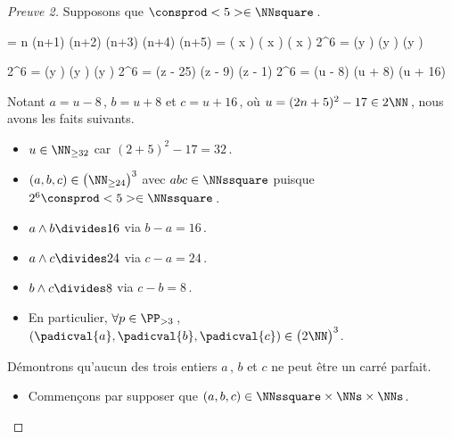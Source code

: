 \begin{proof}[Preuve 2]%
    Supposons que $\consprod<5> \in \NNsquare$\,.

    \medskip
    \begin{stepcalc}[style = ar*, ope = \iff]
    	 = 
			n (n+1) (n+2) (n+3) (n+4) (n+5)
    	\consprod<5> = 
			\big( x \pm {} \big) \big( x \pm {} \big) \big( x \pm {} \big) 
    	2^6 \consprod<5> = 
			(y ) (y ) (y )
    \end{stepcalc}
    
    \begin{stepcalc}[style = ar*, ope = \iff]
    	2^6 \consprod<5> = 
			(y ) (y ) (y )
    	2^6 \consprod<5> = 
			(z - 25) (z - 9) (z - 1) 
    	2^6 \consprod<5> = 
			(u - 8) (u + 8) (u + 16)
    \end{stepcalc}

    \medskip
    Notant $a = u - 8$\,, $b = u + 8$ et $c = u + 16$\,, où $u = (2 n + 5)^2 - 17 \in 2 \NN$\,, nous avons les faits suivants.
    
    \begin{itemize}
		\item $u \in \NN_{\geq 32}$ car $(2 + 5)^2 - 17 = 32$\,.

		\item $(a, b, c) \in \big( \NN_{\geq 24} \big)^3$ avec $abc \in \NNssquare$ puisque $2^6 \consprod<5> \in \NNssquare$\,.

		\item $a \wedge b \divides 16$ via $b - a = 16$\,.

		\item $a \wedge c \divides 24$ via $c - a = 24$\,.

		\item $b \wedge c \divides 8$  via $c - b = 8$\,.

		\item En particulier, 
		$\forall p \in \PP_{>3}$\,, 
		$(\padicval{a}, \padicval{b}, \padicval{c}) \in \big( 2 \NN \big)^3$.
	\end{itemize}

	\medskip
	
	Démontrons qu'aucun des trois entiers $a$\,, $b$ et $c$ ne peut être un carré parfait.
	\begin{itemize}
		\medskip
		\item Commençons par supposer que $(a, b, c) \in \NNssquare \times \NNs \times \NNs$. 
		

\end{itemize}
\end{proof}

